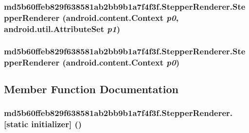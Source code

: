 \hypertarget{classmd5b60ffeb829f638581ab2bb9b1a7f4f3f_1_1_stepper_renderer_fe7aea890375adfb8ffdd5ac53251bf3}{
\subsubsection[{StepperRenderer}]{\setlength{\rightskip}{0pt plus 5cm}md5b60ffeb829f638581ab2bb9b1a7f4f3f.StepperRenderer.StepperRenderer (android.content.Context {\em p0}, \/  android.util.AttributeSet {\em p1})}}
\label{classmd5b60ffeb829f638581ab2bb9b1a7f4f3f_1_1_stepper_renderer_fe7aea890375adfb8ffdd5ac53251bf3}


\hypertarget{classmd5b60ffeb829f638581ab2bb9b1a7f4f3f_1_1_stepper_renderer_990efbc9f4d9a90ef0b0ffdf69560899}{
\subsubsection[{StepperRenderer}]{\setlength{\rightskip}{0pt plus 5cm}md5b60ffeb829f638581ab2bb9b1a7f4f3f.StepperRenderer.StepperRenderer (android.content.Context {\em p0})}}
\label{classmd5b60ffeb829f638581ab2bb9b1a7f4f3f_1_1_stepper_renderer_990efbc9f4d9a90ef0b0ffdf69560899}




\subsection{Member Function Documentation}
\hypertarget{classmd5b60ffeb829f638581ab2bb9b1a7f4f3f_1_1_stepper_renderer_4d0fb372a0768189e1afe16395b5aba2}{
\subsubsection[{[static initializer]}]{\setlength{\rightskip}{0pt plus 5cm}md5b60ffeb829f638581ab2bb9b1a7f4f3f.StepperRenderer.\mbox{[}static initializer\mbox{]} ()}}
\label{classmd5b60ffeb829f638581ab2bb9b1a7f4f3f_1_1_stepper_renderer_4d0fb372a0768189e1afe16395b5aba2}




